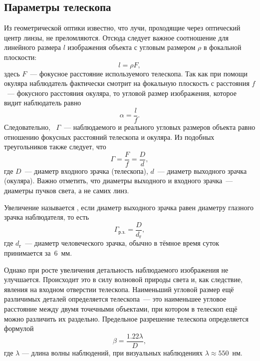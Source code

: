 \subsection{Параметры телескопа}
Из геометрической оптики известно, что лучи, проходящие через оптический центр линзы, не преломляются. Отсюда следует важное соотношение для линейного размера $l$ изображения объекта с угловым размером $\rho$ в фокальной плоскости:
\begin{equation}
	l = \rho F,
\end{equation}
здесь $F$~--- фокусное расстояние используемого телескопа.
Так как при помощи окуляра наблюдатель фактически смотрит на фокальную плоскость с расстояния $f$~--- фокусного расстояния окуляра, то угловой размер изображения, которое видит наблюдатель равно
\begin{equation}
	\alpha = \frac{l}{f}.
	\label{eq:zoom2}
\end{equation} 
Следовательно, ~$\Gamma$~--- наблюдаемого и реального угловых размеров объекта равно отношению фокусных расстояний телескопа и окуляра. Из подобных треугольников также следует, что
\begin{equation}
	\Gamma =\frac{F}{f} = \frac{D}{d},
	\label{eq:zoom1}
\end{equation}
где $D$~--- диаметр входного зрачка (телескопа), $d$~--- диаметр выходного зрачка (окуляра). Важно отметить, что диаметры выходного и входного зрачка~--- диаметры пучков света, а не самих линз.

Увеличение называется , если диаметр выходного зрачка равен диаметру глазного зрачка наблюдателя, то есть
\begin{equation}
\Gamma_\text{р.з.} = \frac{D}{d_\text{г}},
\end{equation}
где $d_\text{г}$~--- диаметр человеческого зрачка, обычно в тёмное время суток принимается за~6~мм.

Однако при росте увеличения детальность наблюдаемого изображения не улучшается. Происходит это в силу волновой природы света и, как следствие, явления  на входном отверстии телескопа. Наименьший угловой размер ещё различимых деталей определяется  телескопа~--- это наименьшее угловое расстояние между двумя точечными объектами, при котором в телескоп ещё можно различить их раздельно. Предельное разрешение телескопа определяется формулой
\begin{equation}
\beta = \frac{1.22\lambda}{D},
\end{equation}
где $\lambda$ --- длина волны наблюдений, при визуальных наблюдениях $\lambda \approx 550$~нм.

